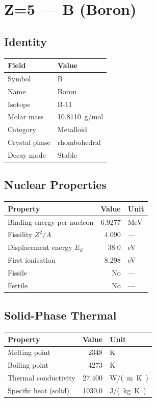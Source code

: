 \documentclass[11pt,a4paper]{article}
\begin{document}
\newpage

\section{Z=5 --- B (Boron)}
\label{sec:Z5}

\subsection{Identity}
\begin{tabular}{ll}
  \toprule
  Field & Value \\
  \midrule
  Symbol & B \\
  Name & Boron \\
  Isotope & B-11 \\
  Molar mass & \SI{10.8110}{g/mol} \\
  Category & Metalloid \\
  Crystal phase & rhombohedral \\
  Decay mode & Stable \\
  \bottomrule
\end{tabular}

\subsection{Nuclear Properties}
\begin{tabular}{lrl}
  \toprule
  Property & Value & Unit \\
  \midrule
  Binding energy per nucleon & 6.9277 & \si{MeV} \\
  Fissility $Z^2/A$ & 4.090 & --- \\
  Displacement energy $E_d$ & 38.0 & \si{eV} \\
  First ionisation & 8.298 & \si{eV} \\
  Fissile & No & --- \\
  Fertile & No & --- \\
  \bottomrule
\end{tabular}

\subsection{Solid-Phase Thermal}
\begin{tabular}{lrl}
  \toprule
  Property & Value & Unit \\
  \midrule
  Melting point & 2348 & \si{K} \\
  Boiling point & 4273 & \si{K} \\
  Thermal conductivity & 27.400 & \si{W/(m.K)} \\
  Specific heat (solid) & 1030.0 & \si{J/(kg.K)} \\
  \bottomrule
\end{tabular}
\end{document}
